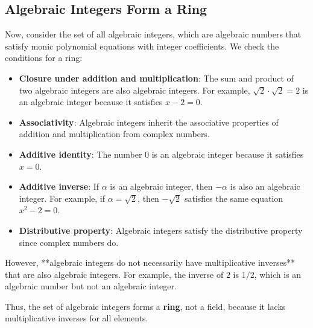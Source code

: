 \documentclass{article}
\newenvironment{proofbox}
  {\begin{mdframed}[linewidth=1pt,linecolor=black,backgroundcolor=white]\noindent\ignorespaces}
  {\end{mdframed}}
\begin{document}
\begin{proofbox}
    \subsection*{Algebraic Integers Form a Ring}
    Now, consider the set of all algebraic integers, which are algebraic numbers that satisfy monic polynomial equations with integer coefficients. We check the conditions for a ring:
    
    \begin{itemize}
        \item \textbf{Closure under addition and multiplication}: The sum and product of two algebraic integers are also algebraic integers. For example, \( \sqrt{2} \cdot \sqrt{2} = 2 \) is an algebraic integer because it satisfies \( x - 2 = 0 \).
        
        \item \textbf{Associativity}: Algebraic integers inherit the associative properties of addition and multiplication from complex numbers.
        
        \item \textbf{Additive identity}: The number \( 0 \) is an algebraic integer because it satisfies \( x = 0 \).
        
        \item \textbf{Additive inverse}: If \( \alpha \) is an algebraic integer, then \( -\alpha \) is also an algebraic integer. For example, if \( \alpha = \sqrt{2} \), then \( -\sqrt{2} \) satisfies the same equation \( x^2 - 2 = 0 \).
        
        \item \textbf{Distributive property}: Algebraic integers satisfy the distributive property since complex numbers do.
    \end{itemize}
    
    However, **algebraic integers do not necessarily have multiplicative inverses** that are also algebraic integers. For example, the inverse of \( 2 \) is \( 1/2 \), which is an algebraic number but not an algebraic integer.
    
    Thus, the set of algebraic integers forms a \textbf{ring}, not a field, because it lacks multiplicative inverses for all elements.
    
\end{proofbox}
\end{document}
